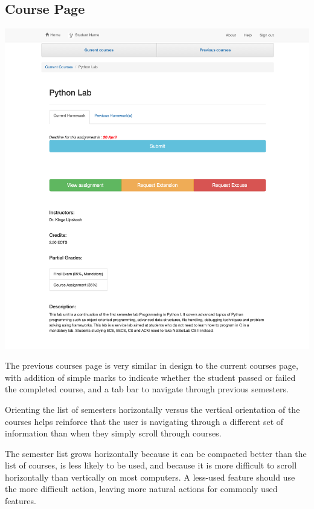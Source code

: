 \subsection{Course Page}

\includegraphics[width=\textwidth]{screenshots/PythonLab.png}

The previous courses page is very similar in design to the current courses page, with addition of simple marks to indicate whether the student passed or failed the completed course, and a tab bar to navigate through previous semesters. 

Orienting the list of semesters horizontally versus the vertical orientation of the courses helps reinforce that the user is navigating through a different set of information than when they simply scroll through courses. 

The semester list grows horizontally because it can be compacted better than the list of courses, is less likely to be used, and because it is more difficult to scroll horizontally than vertically on most computers. A less-used feature should use the more difficult action, leaving more natural actions for commonly used features.